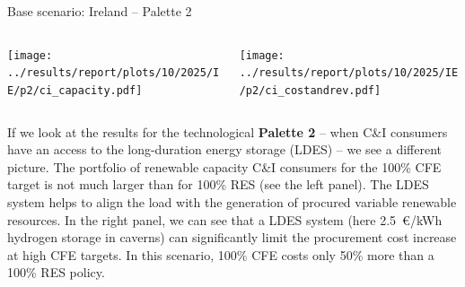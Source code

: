 \begin{frame}{Base scenario: Ireland -- Palette 2}

    {\footnotesize
  
    \begin{columns}
    \begin{column}{7cm}
    \centering
    \texttt{[image: ../results/report/plots/10/2025/IE/p2/ci\_capacity.pdf]}
    \end{column}
  
    \begin{column}{8cm}
    \centering
    \texttt{[image: ../results/report/plots/10/2025/IE/p2/ci\_costandrev.pdf]}
    \end{column}
  
    \end{columns}
  
    \begin{columns}
    \begin{column}{15cm}
    If we look at the results for the technological {\bf Palette 2} -- 
    when C\&I consumers have an access to the long-duration energy storage (LDES) --
    we see a different picture. The portfolio of renewable capacity 
    C\&I consumers for the 100\% CFE target is not much larger 
    than for 100\% RES (see the left panel). The LDES system helps to align the load 
    with the generation of procured variable renewable resources. 
    In the right panel, we can see that a LDES system (here 2.5~€/kWh 
    hydrogen storage in caverns) can \alert{significantly limit the procurement cost
    increase} at high CFE targets. In this scenario, 
    100\% CFE costs only 50\% more than a 100\% RES policy.

    \end{column}
    \end{columns}
    }
  
\end{frame}




